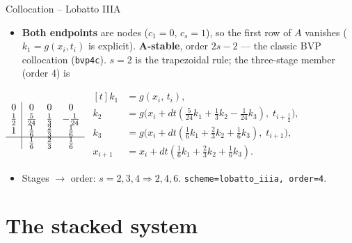 \documentclass[11pt,aspectratio=169]{beamer}
\begin{document}
\begin{frame}{Collocation -- Lobatto IIIA}

\begin{itemize}
\item \textbf{Both endpoints} are nodes ($c_1=0,\,c_s=1$), so the first row
  of $A$ vanishes ($k_1=g(x_i,t_i)$ is explicit). \textbf{A-stable}, order
  $2s{-}2$ — the classic BVP collocation (\texttt{bvp4c}). $s{=}2$ is the
  trapezoidal rule; the three-stage member (order 4) is
\end{itemize}

\begin{center}
\small
$\begin{array}{c|ccc}
  0 & 0 & 0 & 0\\
  \tfrac12 & \tfrac{5}{24} & \tfrac13 & -\tfrac1{24}\\
  1 & \tfrac16 & \tfrac23 & \tfrac16\\ \hline
  & \tfrac16 & \tfrac23 & \tfrac16
\end{array}$
\quad
$\begin{aligned}[t]
k_1 &= g(x_i,\, t_i),\\
k_2 &= g\bigl(x_i + dt(\tfrac{5}{24} k_1 + \tfrac13 k_2 - \tfrac1{24} k_3),\; t_{i+\frac12}\bigr),\\
k_3 &= g\bigl(x_i + dt(\tfrac16 k_1 + \tfrac23 k_2 + \tfrac16 k_3),\; t_{i+1}\bigr),\\
x_{i+1} &= x_i + dt(\tfrac16 k_1 + \tfrac23 k_2 + \tfrac16 k_3).
\end{aligned}$
\end{center}

\begin{itemize}
\item Stages $\to$ order: $s=2,3,4 \Rightarrow 2,4,6$. \quad
  \texttt{scheme=lobatto\_iiia, order=4}.
\end{itemize}

\end{frame}

\section{The stacked system}
\end{document}

